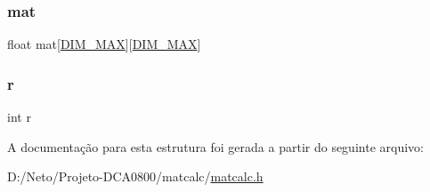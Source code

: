 \subsubsection{\texorpdfstring{mat}{mat}}
{\footnotesize\ttfamily float mat\mbox{[}\hyperlink{matcalc_8h_a4bf6f11165a23227af11f1d0d75798a4}{D\+I\+M\+\_\+\+M\+AX}\mbox{]}\mbox{[}\hyperlink{matcalc_8h_a4bf6f11165a23227af11f1d0d75798a4}{D\+I\+M\+\_\+\+M\+AX}\mbox{]}}

\mbox{\label{structmatriz_acab531abaa74a7e664e3986f2522b33a}} 
\subsubsection{\texorpdfstring{r}{r}}
{\footnotesize\ttfamily int r}



A documentação para esta estrutura foi gerada a partir do seguinte arquivo\+:\begin{DoxyCompactItemize}
\item 
D\+:/\+Neto/\+Projeto-\/\+D\+C\+A0800/matcalc/\hyperlink{matcalc_8h}{matcalc.\+h}\end{DoxyCompactItemize}
